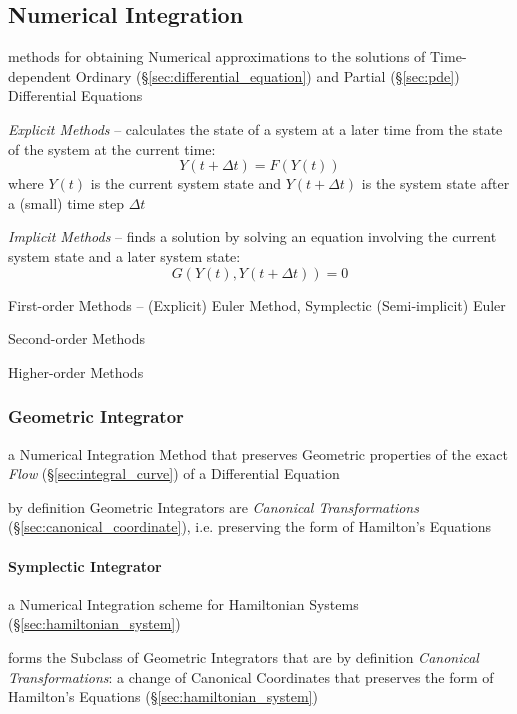 \subsection{Numerical Integration}\label{sec:numerical_integration}

methods for obtaining Numerical approximations to the solutions of
Time-dependent Ordinary (\S\ref{sec:differential_equation}) and Partial
(\S\ref{sec:pde}) Differential Equations

\emph{Explicit Methods} -- calculates the state of a system at a later time
from the state of the system at the current time:
\[
  Y(t+\Delta{t}) = F(Y(t))
\]
where $Y(t)$ is the current system state and $Y(t + \Delta{t})$ is the system
state after a (small) time step $\Delta{t}$

\emph{Implicit Methods} -- finds a solution by solving an equation involving
the current system state and a later system state:
\[
  G(Y(t), Y(t + \Delta{t})) = 0
\]

First-order Methods -- (Explicit) Euler Method, Symplectic (Semi-implicit) Euler

Second-order Methods

Higher-order Methods



\subsubsection{Geometric Integrator}\label{sec:geometric_integrator}

a Numerical Integration Method that preserves Geometric properties of the exact
\emph{Flow} (\S\ref{sec:integral_curve}) of a Differential Equation

by definition Geometric Integrators are \emph{Canonical Transformations}
(\S\ref{sec:canonical_coordinate}), i.e. preserving the form of Hamilton's
Equations



\paragraph{Symplectic Integrator}\label{sec:symplectic_integrator}\hfill

a Numerical Integration scheme for Hamiltonian Systems
(\S\ref{sec:hamiltonian_system})

forms the Subclass of Geometric Integrators that are by definition
\emph{Canonical Transformations}: a change of Canonical Coordinates that
preserves the form of Hamilton's Equations (\S\ref{sec:hamiltonian_system})



